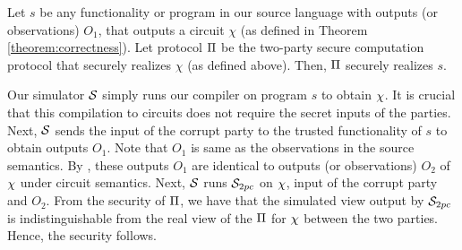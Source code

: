 \begin{theorem}[Security]\label{theorem:security}
Let $s$ be any functionality or program in our source language with
outputs (or observations) $O_1$, that outputs a circuit
$\chi$ (as defined in Theorem \ref{theorem:correctness}). Let protocol
$\Pi$ be the two-party secure computation protocol that securely
realizes $\chi$ (as defined above). Then, $\Pi$ securely realizes
$s$.
\end{theorem}

Our simulator $\mathcal{S}$ simply runs our compiler on program $s$ to obtain $\chi$. It is crucial that this compilation to circuits does not require the secret inputs of the parties. Next, $\mathcal{S}$ sends the input of the corrupt party to the trusted functionality of $s$ to obtain outputs $O_1$. Note that $O_1$ is same as the observations in the source semantics. 
By , these outputs $O_1$ are identical to outputs (or observations) $O_2$ of $\chi$ under circuit semantics. 
Next, $\mathcal{S}$ runs $\simu_{\tiny{2pc}}$ on $\chi$, input of the corrupt party and $O_2$. 
From the security of $\Pi$, we have that the simulated view output by $\simu_{\tiny{2pc}}$ is indistinguishable from the real view of the $\Pi$ for $\chi$ between the two parties. Hence, the security follows.
 
